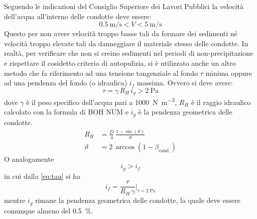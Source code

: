 Seguendo le indicazioni del Consiglio Superiore dei Lavori Pubblici la velocità dell'acqua all'interno delle condotte deve essere:
\begin{equation}
    \SI{0.5}{\metre\per\second} < V <  \SI{5}{\metre\per\second}
\end{equation}
Questo per non avere velocità troppo basse tali da formare dei sedimenti né velocità troppo elevate tali da danneggiare il materiale stesso delle condotte.
In realtà, per verificare che non si creino sedimenti nel periodi di non-precipitazione e rispettare il cosidetto criterio di autopulizia, si è utilizzato anche un altro metodo che fa riferimento ad una tensione tangenziale al fondo $\tau$ minima oppure ad una pendenza del fondo (o idraulica) $i_f$ massima. 
Ovvero si deve avere:
\begin{equation}
    \label{eq:tau}
    \tau = \gamma \, R_H \, i_g > \SI{2}{\pascal}
\end{equation}
dove $\gamma$ è il peso specifico dell'acqua pari a \SI{1000}{\newton\per\metre\cubed}, $R_H$ è il raggio idraulico calcolato con la formula di BOH NUM e $i_g$ è la pendenza geometrica delle condotte.  
\begin{align}
    R_H &= \frac{D}{4} \, \frac{1 - \sin(\vartheta)}{\vartheta} \\
    \vartheta &= 2 \, \arccos(1 - \beta_\text{cond.})
\end{align}
O analogamente
\begin{equation}
    i_g > i_f  
\end{equation}
in cui dalla \ref{eq:tau} si ha 
\begin{equation}
    i_f = \frac{\tau}{R_H \, \gamma} \biggr|_{\tau=\SI{2}{\pascal}}
\end{equation}    
mentre $i_g$ rimane la pendenza geometrica delle condotte, la quale deve essere comunque almeno del \SI{0.5}{\percent}.






